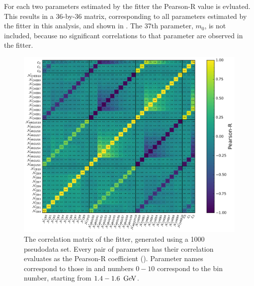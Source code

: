 For each two parameters estimated by the \Mbc fitter the Pearson-R value is evluated.
This results in a 36-by-36 matrix, corresponding to all parameters estimated by the \Mbc fitter in this analysis, and shown in .
The 37th parameter, $m_0$, is not included, because no significant correlations to that parameter are observed in the fitter.
\begin{figure}[htbp!]
    \includegraphics[width=1\textwidth]{figures/mc_validation/correlation_matrix.pdf}
    \caption{\label{fig:correlation_matrix}The correlation matrix of the \Mbc fitter, generated using a 1000 pseudodata set.
    Every pair of parameters has their correlation evaluates as the Pearson-R coefficient ().
    Parameter names correspond to those in  and numbers $0-10$ correspond to the bin number, starting from $1.4-1.6~\mathrm{\,Ge\kern -0.1em V}$.
    }
\end{figure}


